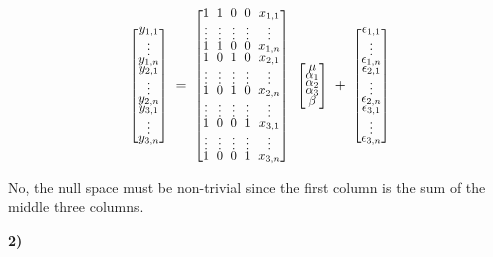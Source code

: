 \documentclass[12pt, letterpaper]{article}
\theoremstyle{definition}
\numberwithin{equation}{section}
\newcommand{\mymatrix}[1]{
	\renewcommand{\arraystretch}{0.5} 
	\setlength\arraycolsep{3pt}       
	\scalebox{0.90}{                  
		$\begin{bmatrix}
			#1
		\end{bmatrix}$
	}                   
	\renewcommand{\arraystretch}{1.0} 
	\setlength\arraycolsep{6pt}       
}
\newcommand{\+}[1]{+_{\scalebox{.375}{#1}}}
\newcommand{\1}{\mathbbm{1}}
\begin{document}
\vspace{-0.5cm}
\begin{align*}
	\mymatrix{y_{1,1}\\ \vdots \\
	y_{1,n}\\ y_{2,1} \\ \vdots \\
	y_{2,n}\\ y_{3,1} \\ \vdots \\ y_{3,n}	}=
	\mymatrix{1&1&0&0&x_{1,1}\\
	\vdots & \vdots & \vdots &\vdots &\vdots\\
	1&1&0&0&x_{1,n}\\
	1&0&1&0&x_{2,1}\\
	\vdots & \vdots & \vdots &\vdots &\vdots\\
	1&0&1&0&x_{2,n}\\
	\vdots & \vdots & \vdots &\vdots &\vdots\\
	1&0&0&1&x_{3,1}\\
	\vdots & \vdots & \vdots &\vdots &\vdots\\
	1&0&0&1&x_{3,n}}\mymatrix{\mu\\ \alpha_1 \\ \alpha_2 \\ \alpha_3 \\ \beta}+\mymatrix{
	\epsilon_{1,1} \\
	\vdots\\
	\epsilon_{1,n}\\
	\epsilon_{2,1} \\
	\vdots\\
	\epsilon_{2,n}\\
	\epsilon_{3,1} \\
	\vdots\\
	\epsilon_{3,n}
	}
\end{align*}


\vspace{\baselineskip}
\noindent\textbf{}
\vspace{\baselineskip}

No, the null space must be non-trivial since the first column is the sum of the middle three columns.





\newpage
\noindent\textbf{2) }
\end{document}
